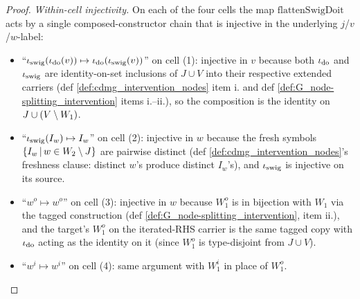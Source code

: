 \documentclass[main]{subfiles}
\providecommand{\flattenSwigDoit}{\mathrm{flattenSwigDoit}}
\begin{document}
\begin{proof}
\smallskip\noindent\emph{Within-cell injectivity.}
On each of the four cells the map $\flattenSwigDoit$ acts by a single composed-constructor chain that is injective in the underlying $j$/$v$/$w$-label:
\begin{itemize}
    \item ``$\iota_{\mathrm{swig}}(\iota_{\operatorname{do}}(v)) \mapsto \iota_{\operatorname{do}}(\iota_{\mathrm{swig}}(v))$'' on cell (1): injective in $v$ because both $\iota_{\operatorname{do}}$ and $\iota_{\mathrm{swig}}$ are identity-on-set inclusions of $J \cup V$ into their respective extended carriers (def \ref{def:cdmg_intervention_nodes} item i. and def \ref{def:G_node-splitting_intervention} items i.--ii.), so the composition is the identity on $J \cup (V \setminus W_1)$.
    \item ``$\iota_{\mathrm{swig}}(I_w) \mapsto I_w$'' on cell (2): injective in $w$ because the fresh symbols $\left \{ I_w \,\middle|\, w \in W_2 \setminus J \right \}$ are pairwise distinct (def \ref{def:cdmg_intervention_nodes}'s freshness clause: distinct $w$'s produce distinct $I_w$'s), and $\iota_{\mathrm{swig}}$ is injective on its source.
    \item ``$w^o \mapsto w^o$'' on cell (3): injective in $w$ because $W_1^o$ is in bijection with $W_1$ via the tagged construction (def \ref{def:G_node-splitting_intervention}, item ii.), and the target's $W_1^o$ on the iterated-RHS carrier is the same tagged copy with $\iota_{\operatorname{do}}$ acting as the identity on it (since $W_1^o$ is type-disjoint from $J \cup V$).
    \item ``$w^i \mapsto w^i$'' on cell (4): same argument with $W_1^i$ in place of $W_1^o$.
\end{itemize}


\end{proof}
\end{document}
